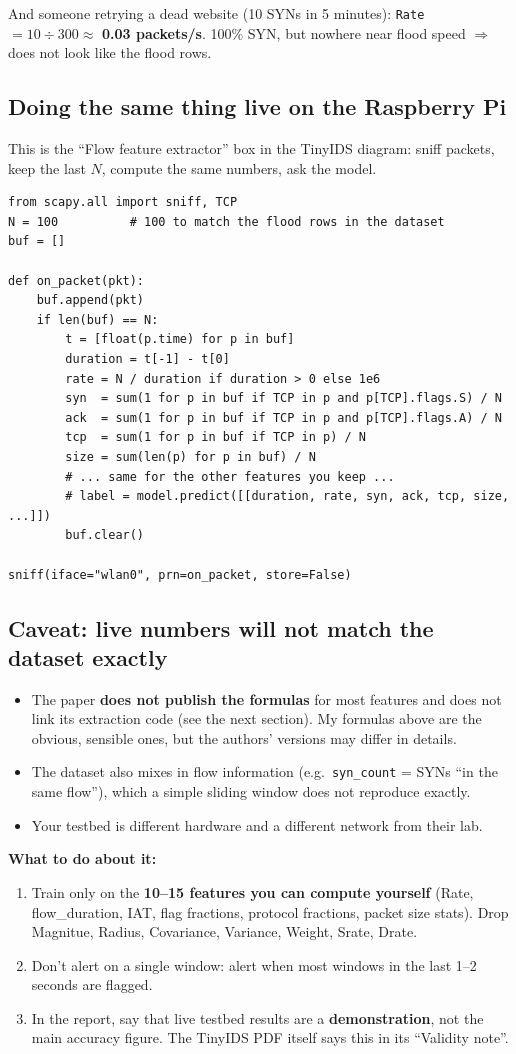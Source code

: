 \documentclass[11pt]{article}
\begin{document}
And someone retrying a dead website (10 SYNs in 5 minutes): \texttt{Rate} $= 10 \div 300 \approx$ \textbf{0.03 packets/s}.
100\% SYN, but nowhere near flood speed $\Rightarrow$ does not look like the flood rows.

\subsection*{Doing the same thing live on the Raspberry Pi}
This is the ``Flow feature extractor'' box in the TinyIDS diagram: sniff packets, keep the last $N$, compute the same numbers, ask the model.

\begin{verbatim}
from scapy.all import sniff, TCP
N = 100          # 100 to match the flood rows in the dataset
buf = []

def on_packet(pkt):
    buf.append(pkt)
    if len(buf) == N:
        t = [float(p.time) for p in buf]
        duration = t[-1] - t[0]
        rate = N / duration if duration > 0 else 1e6
        syn  = sum(1 for p in buf if TCP in p and p[TCP].flags.S) / N
        ack  = sum(1 for p in buf if TCP in p and p[TCP].flags.A) / N
        tcp  = sum(1 for p in buf if TCP in p) / N
        size = sum(len(p) for p in buf) / N
        # ... same for the other features you keep ...
        # label = model.predict([[duration, rate, syn, ack, tcp, size, ...]])
        buf.clear()

sniff(iface="wlan0", prn=on_packet, store=False)
\end{verbatim}

\subsection*{Caveat: live numbers will not match the dataset exactly}
\begin{itemize}
\item The paper \textbf{does not publish the formulas} for most features and does not link its extraction code (see the next section).
My formulas above are the obvious, sensible ones, but the authors' versions may differ in details.
\item The dataset also mixes in flow information (e.g.\ \texttt{syn\_count} = SYNs ``in the same flow''), which a simple sliding window does not reproduce exactly.
\item Your testbed is different hardware and a different network from their lab.
\end{itemize}
\textbf{What to do about it:}
\begin{enumerate}
\item Train only on the \textbf{10--15 features you can compute yourself} (Rate, flow\_duration, IAT, flag fractions, protocol fractions, packet size stats). Drop Magnitue, Radius, Covariance, Variance, Weight, Srate, Drate.
\item Don't alert on a single window: alert when most windows in the last 1--2 seconds are flagged.
\item In the report, say that live testbed results are a \textbf{demonstration}, not the main accuracy figure. The TinyIDS PDF itself says this in its ``Validity note''.
\end{enumerate}
\end{document}

